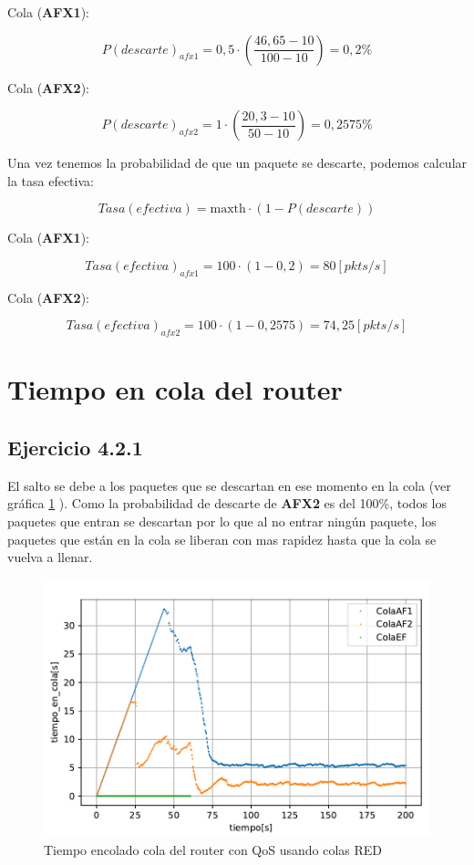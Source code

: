 Cola (\textbf{AFX1}):

\[
P(descarte)_{afx1} = 0,5 \cdot \left(\frac{46,65 - 10}{100 - 10}\right) = 0,2\%
\]

Cola (\textbf{AFX2}):

\[
P(descarte)_{afx2} = 1 \cdot \left(\frac{20,3 - 10}{50 - 10}\right) = 0,2575\%
\]

Una vez tenemos la probabilidad de que un paquete se descarte, podemos calcular la tasa efectiva:

\[
Tasa(efectiva) = \text{maxth} \cdot (1 - P(descarte))
\]

Cola (\textbf{AFX1}): 

\[
Tasa(efectiva)_{afx1} = 100 \cdot (1 - 0,2) = 80 [pkts/s]
\]

Cola (\textbf{AFX2}):

\[
Tasa(efectiva)_{afx2} = 100 \cdot (1 - 0,2575) = 74,25 [pkts/s]
\]


\section{Tiempo en cola del router}
\subsection{Ejercicio 4.2.1}

El salto se debe a los paquetes que se descartan en ese momento en la cola (ver gráfica \ref{fig:colasRED_time} ). Como la probabilidad de descarte de \textbf{AFX2} 
es del 100\%, todos los paquetes que entran se descartan por lo que al no entrar ningún paquete, los paquetes que están en la cola se liberan 
con mas rapidez hasta que la cola se vuelva a llenar.

\begin{figure}[!ht]
    \centering
    \includegraphics{graficas/RED/tiempo_en_cola_red.pdf}
    \caption{Tiempo encolado cola del router con QoS usando colas RED}
    \label{fig:colasRED_time}
\end{figure}

